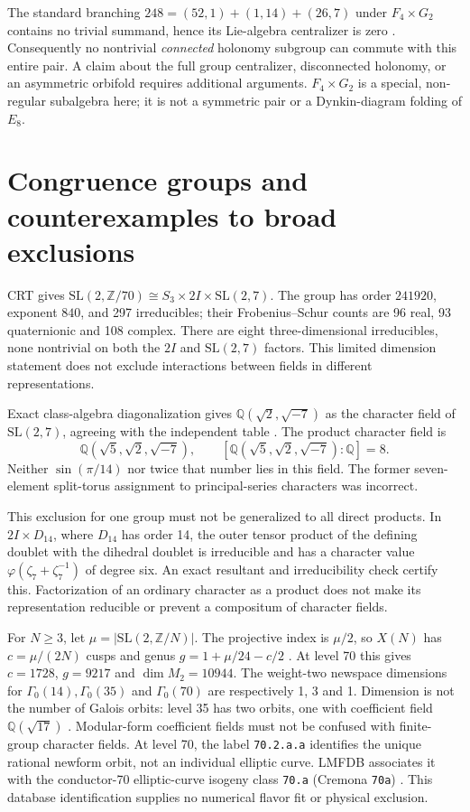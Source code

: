 \documentclass[11pt,a4paper]{amsart}
\newcommand{\Q}{\mathbb Q}
\newcommand{\Z}{\mathbb Z}
\newcommand{\SL}{\mathrm{SL}}
\begin{document}
The standard branching
$248=(52,1)+(1,14)+(26,7)$ under $F_4\times G_2$ contains no trivial
summand, hence its Lie-algebra centralizer is zero \cite{SageBranching}.
Consequently no nontrivial \emph{connected} holonomy subgroup can commute
with this entire pair. A claim about the full group centralizer, disconnected
holonomy, or an asymmetric orbifold requires additional arguments.
$F_4\times G_2$ is a special, non-regular subalgebra here; it is not a
symmetric pair or a Dynkin-diagram folding of $E_8$.

\section{Congruence groups and counterexamples to broad exclusions}
CRT gives
$\SL(2,\Z/70)\cong S_3\times2I\times\SL(2,7)$.
The group has order $241920$, exponent $840$, and 297 irreducibles; their
Frobenius--Schur counts are 96 real, 93 quaternionic and 108 complex.
There are eight three-dimensional irreducibles, none nontrivial on both
the $2I$ and $\SL(2,7)$ factors. This limited dimension statement does not
exclude interactions between fields in different representations.

Exact class-algebra diagonalization gives
$\Q(\sqrt2,\sqrt{-7})$ as the character field of $\SL(2,7)$, agreeing with
the independent table \cite{GroupNamesSL27}. The product character field is
\[\Q(\sqrt5,\sqrt2,\sqrt{-7}),\qquad [\Q(\sqrt5,\sqrt2,\sqrt{-7}):\Q]=8.\]
Neither $\sin(\pi/14)$ nor twice that number lies in this field.
The former seven-element split-torus assignment to principal-series
characters was incorrect.

This exclusion for one group must not be generalized to all direct
products. In $2I\times D_{14}$, where $D_{14}$ has order 14, the outer
tensor product of the defining doublet with the dihedral doublet is
irreducible and has a character value
$\varphi(\zeta_7+\zeta_7^{-1})$ of degree six. An exact resultant and
irreducibility check certify this. Factorization of an ordinary character
as a product does not make its representation reducible or prevent a
compositum of character fields.

For $N\geq3$, let $\mu=|\SL(2,\Z/N)|$. The projective index is $\mu/2$,
so $X(N)$ has $c=\mu/(2N)$ cusps and genus
$g=1+\mu/24-c/2$ \cite{SageGamma}. At level 70 this gives
$c=1728$, $g=9217$ and $\dim M_2=10944$.
The weight-two newspace dimensions for $\Gamma_0(14),\Gamma_0(35)$ and
$\Gamma_0(70)$ are respectively 1, 3 and 1. Dimension is not the number
of Galois orbits: level 35 has two orbits, one with coefficient field
$\Q(\sqrt{17})$ \cite{LMFDB35,LMFDB35Quadratic}. Modular-form coefficient fields must not
be confused with finite-group character fields. At level 70, the label
\texttt{70.2.a.a} identifies the unique rational newform orbit, not an
individual elliptic curve. LMFDB associates it with the conductor-70
elliptic-curve isogeny class \texttt{70.a} (Cremona \texttt{70a})
\cite{LMFDB70,LMFDB70Curve}. This database identification supplies no
numerical flavor fit or physical exclusion.
\end{document}
